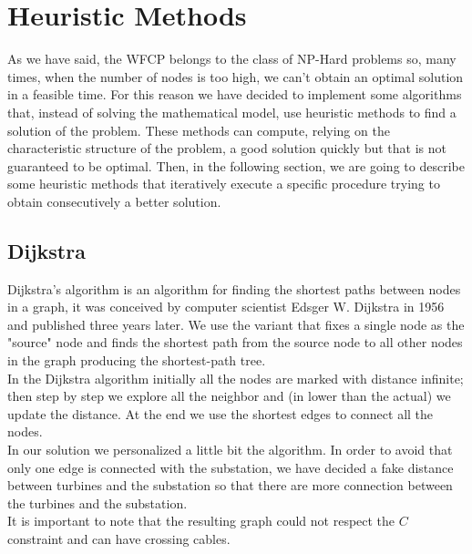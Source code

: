 
\chapter{Heuristic Methods}
\label{chp:5-Heuristic}
As we have said, the WFCP belongs to the class of NP-Hard problems so, many times, when the number of nodes is too high, we can’t obtain an optimal solution in a feasible time.
For this reason we have decided to implement some algorithms that, instead of solving the mathematical model, use heuristic methods to find a solution of the problem. These methods can compute, relying on the characteristic structure of the problem, a good solution quickly but that is not guaranteed to be optimal.
Then, in the following section, we are going to describe some heuristic methods that iteratively execute a specific procedure trying to obtain consecutively a better solution.
\section{Dijkstra}
Dijkstra's algorithm is an algorithm for finding the shortest paths between nodes in a graph, it was conceived by computer scientist Edsger W. Dijkstra in 1956 and published three years later. We use the variant that fixes a single node as the "source" node and finds the shortest path from the source node to all other nodes in the graph producing the shortest-path tree. \\
In the Dijkstra algorithm initially all the nodes are marked with distance infinite; then step by step we explore all the neighbor and (in lower than the actual) we update the distance. At the end we use the shortest edges to connect all the nodes. \\
In our solution we personalized a little bit the algorithm. In order to avoid that only one edge is connected with the substation, we have decided a fake distance between turbines and the substation so that there are more connection between the turbines and the substation.\\
It is important to note that the resulting graph could not respect the $C$ constraint and can have crossing cables. 

